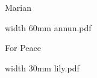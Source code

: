 \beginpart Marian


\bigskip



\paginaproxima

%


%




\bigskip




\eject


\paginaproxima



\paginaproxima


\paginaproxima


\paginaproxima




\bigskip

\saveimageresource width 60mm {annun.pdf}

\centerline{\useimageresource \lastsavedimageresourceindex}




\eject

\beginpart For Peace



\paginaproxima


\bigskip



\bigskip

\saveimageresource width 30mm {lily.pdf}

\centerline{\useimageresource \lastsavedimageresourceindex}




